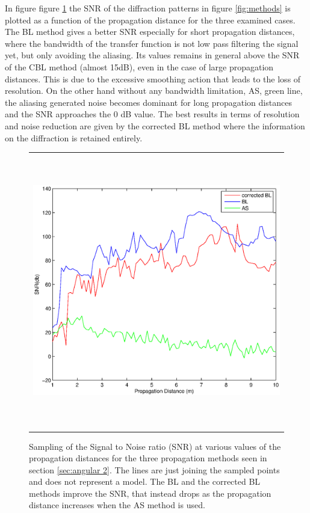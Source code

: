  In figure figure \ref{fig:SNR1} the SNR of the diffraction patterns in figure \ref{fig:methods} is plotted as a function of the propagation distance for the three examined cases. The BL method gives a better SNR especially for short propagation distances, where the bandwidth of the transfer function is not low pass filtering the signal yet, but only avoiding the aliasing. Its values remains in general above the SNR of the CBL method (almost 15dB), even in the case of large propagation distances. This is due to the excessive smoothing action that leads to the loss of resolution. On the other hand without any bandwidth limitation, AS, green line, the aliasing generated noise becomes dominant for long propagation distances and the SNR approaches the 0 dB value. The best results in terms of resolution and noise reduction are given by the corrected BL method where the information on the diffraction is retained entirely.
 \begin{figure}[H]
 	\begin{center}
 		\begin{tabular}{c}
 			\includegraphics[height=12cm]{SNR_com.eps}
 		\end{tabular}
 	\end{center}
 	\caption	{ \label{fig:SNR1} 
 		Sampling of the  Signal to Noise ratio (SNR) at various values of the propagation distances for the three propagation methods seen in section \ref{sec:angular 2}. The lines are just joining the sampled points and does not represent a model. The BL and the corrected BL methods improve the SNR, that instead drops as the propagation distance increases when the AS method is used. }
 \end{figure}
